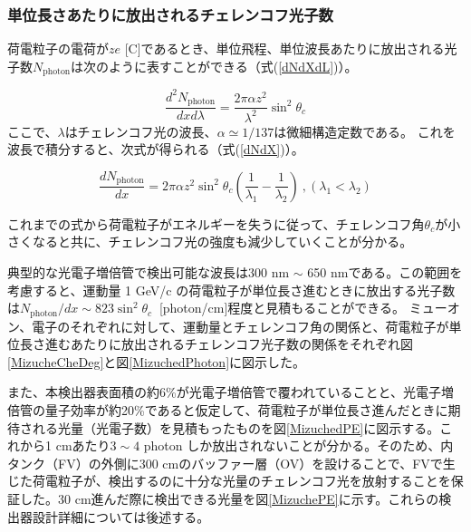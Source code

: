 \documentclass[11pt]{jreport}
\newcommand{\figref}[1]{図\ref{#1}}
\newcommand{\equref}[1]{式(\ref{#1})}
\newcommand{\photon}{\mathrm{photon}}
\begin{document}
\subsubsection{単位長さあたりに放出されるチェレンコフ光子数}
荷電粒子の電荷が$ze$ [C]であるとき、単位飛程、単位波長あたりに放出される光子数$N_{\photon}$は次のように表すことができる（\equref{dNdXdL}）。

\begin{equation}
\frac{d^{2}N_{\photon}}{dxd\lambda} =  \frac{2 \pi \alpha z^{2}}{\lambda^{2}} \sin^{2} \theta_{c}
\label{dNdXdL}
\end{equation}
ここで、$\lambda$はチェレンコフ光の波長、$\alpha \simeq 1/137$は微細構造定数である。
これを波長で積分すると、次式が得られる（\equref{dNdX}）。

\begin{equation}
\frac{dN_{\photon}}{dx} =  2 \pi \alpha z^{2} \sin^{2} \theta_{c} \left( \frac{1}{\lambda_{1}}-\frac{1}{\lambda_{2}} \right) \ , (\lambda_{1} < \lambda_{2})
\label{dNdX}
\end{equation}

これまでの式から荷電粒子がエネルギーを失うに従って、チェレンコフ角$\theta_{c}$が小さくなると共に、チェレンコフ光の強度も減少していくことが分かる。

典型的な光電子増倍管で検出可能な波長は300 nm $\sim$ 650 nmである。この範囲を考慮すると、運動量 1 GeV/c の荷電粒子が単位長さ進むときに放出する光子数は$N_{\photon}/dx \sim 823\sin^{2}\theta_{c}\ $ [photon/cm]程度と見積もることができる。
ミューオン、電子のそれぞれに対して、運動量とチェレンコフ角の関係と、荷電粒子が単位長さ進むあたりに放出されるチェレンコフ光子数の関係をそれぞれ\figref{MizucheCheDeg}と\figref{MizuchedPhoton}に図示した。

また、本検出器表面積の約6\%が光電子増倍管で覆われていることと、光電子増倍管の量子効率が約20\%であると仮定して、荷電粒子が単位長さ進んだときに期待される光量（光電子数）を見積もったものを\figref{MizuchedPE}に図示する。これから1 cmあたり$3\sim4$ photon しか放出されないことが分かる。そのため、内タンク（FV）の外側に300 cmのバッファー層（OV）を設けることで、FVで生じた荷電粒子が、検出するのに十分な光量のチェレンコフ光を放射することを保証した。30 cm進んだ際に検出できる光量を\figref{MizuchePE}に示す。これらの検出器設計詳細については後述する。
\end{document}
